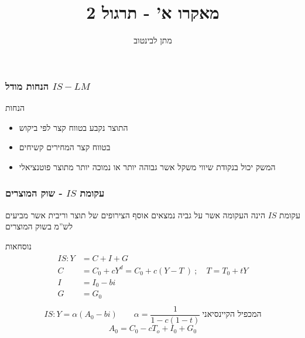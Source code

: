 \documentclass[usenames,dvipsnames]{beamer}
\title[{}]{{מאקרו א' - תרגול 2}}
\author{\texthebrew{ מתן לבינטוב}}
\institute[{ אב"ג}]{{ אוניברסיטת בן גוריון בנגב}}
\date{}
\begin{document}
	\begin{RTL}
		\begin{frame}
			\titlepage
		\end{frame}

        \begin{frame}
            \frametitle{ הנחות מודל  $ IS-LM $  }
            \begin{block}{הנחות}
                \begin{itemize}
                    \item התוצר נקבע בטווח קצר לפי ביקוש
                    \item בטווח קצר המחירים קשיחים
                    \item המשק יכול בנקודת שיווי משקל אשר גבוהה יותר או נמוכה יותר מתוצר פוטנציאלי
                \end{itemize}
            \end{block}
        \end{frame}


        \begin{frame}
            \frametitle{עקומת $IS$ - שוק המוצרים}
            עקומת $IS$ הינה העקומה אשר על גביה נמצאים אוסף הצירופים של תוצר וריבית אשר מביעים לש''מ בשוק המוצרים
            \begin{block}{נוסחאות}
                \begin{align*}
                    \begin{split}
                        IS : Y &= C + I + G \\
                        C & = C_0 + cY^d = C_0  + c\left( Y-T \ \right) \   ; \quad T = T_0 + tY \\
                        I & =   I_0 - bi \\ 
                        G &= G_0 \\ 
                    \end{split}
                \end{align*}
                \begin{equation*}
                    IS : Y = \alpha \left( A_0 - bi \right) \qquad \alpha = \frac{1}{1-c(1-t)} \: \text{המכפיל הקיינסיאני}
                \end{equation*}
                \begin{equation*}
                    A_0 = C_0 - cT_o + I_0 + G_0
                \end{equation*}
            \end{block}



\end{frame}
\end{RTL}
\end{document}
